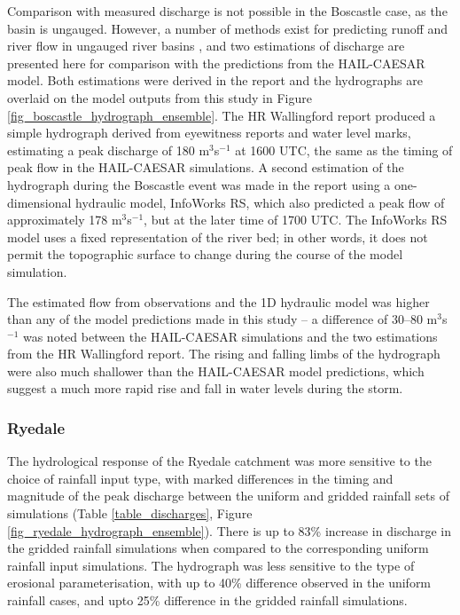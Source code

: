 Comparison with measured discharge is not possible in the Boscastle case, as the basin is ungauged. However, a number of methods exist for predicting runoff and river flow in ungauged river basins \citep{sivapalan2003prediction,bloschl2013runoff}, and two estimations of discharge are presented here for comparison with the predictions from the HAIL-CAESAR model. Both estimations were derived in the \citet{wallingford2005flooding} report and the hydrographs are overlaid on the model outputs from this study in Figure \ref{fig_boscastle_hydrograph_ensemble}. The HR Wallingford report produced a simple hydrograph derived from eyewitness reports and water level marks, estimating a peak discharge of 180 m\(^3\)s\(^{-1}\) at 1600 UTC, the same as the timing of peak flow in the HAIL-CAESAR simulations. A second estimation of the hydrograph during the Boscastle event was made in the report using a one-dimensional hydraulic model, InfoWorks RS, which also predicted a peak flow of approximately 178 m\(^3\)s\(^{-1}\), but at the later time of 1700 UTC. The InfoWorks RS model uses a fixed representation of the river bed; in other words, it does not permit the topographic surface to change during the course of the model simulation. 

The estimated flow from observations and the 1D hydraulic model was higher than any of the model predictions made in this study -- a difference of 30--80 m\(^3\)s\(^{-1}\) was noted between the HAIL-CAESAR simulations and the two estimations from the HR Wallingford report. The rising and falling limbs of the hydrograph were also much shallower than the HAIL-CAESAR model predictions, which suggest a much more rapid rise and fall in water levels during the storm. 

\subsubsection{Ryedale}

The hydrological response of the Ryedale catchment was more sensitive to the choice of rainfall input type, with marked differences in the timing and magnitude of the peak discharge between the uniform and gridded rainfall sets of simulations (Table \ref{table_discharges}, Figure \ref{fig_ryedale_hydrograph_ensemble}). There is up to 83\% increase in discharge in the gridded rainfall simulations when compared to the corresponding uniform rainfall input simulations. The hydrograph was less sensitive to the type of erosional parameterisation, with up to 40\% difference observed in the uniform rainfall cases, and upto 25\% difference in the gridded rainfall simulations. 

